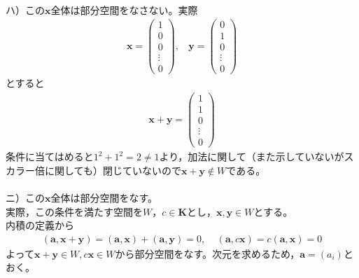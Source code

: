 \documentclass[dvipdfmx,uplatex,11pt]{jsarticle}
\begin{document}
\dotfill \\
ハ）この$\bm{x}全体$は部分空間をなさない。実際
\begin{eqnarray*}
\bm{x}=
\begin{pmatrix}
1 \\
0 \\
0 \\
\vdots \\
0
\end{pmatrix}
,~~~~
\bm{y}=
\begin{pmatrix}
0 \\
1 \\
0 \\
\vdots \\
0
\end{pmatrix}
\end{eqnarray*}
とすると
\begin{eqnarray*}
\bm{x}+\bm{y}=
\begin{pmatrix}
1 \\
1 \\
0 \\
\vdots \\
0
\end{pmatrix}
\end{eqnarray*}
条件に当てはめると$1^2+1^2=2 \neq 1$より，加法に関して（また示していないがスカラー倍に関しても）閉じていないので$\bm{x}+\bm{y} \not\in W$である。\\
\dotfill \\
ニ）この$\bm{x}全体$は部分空間をなす。$実際，この条件を満たす空間をW，c \in \bm{K}とし，\bm{x,y} \in W$とする。\\
内積の定義から
\begin{eqnarray*}
(\bm{a},\bm{x}+\bm{y})=(\bm{a},\bm{x})+(\bm{a},\bm{y})=0 ,~~~~~(\bm{a},c\bm{x})=c(\bm{a},\bm{x})=0
\end{eqnarray*}
よって$\bm{x}+\bm{y} \in W, c\bm{x} \in W$から部分空間をなす。次元を求めるため，$\bm{a}=(a_{i})$とおく。
\end{document}
